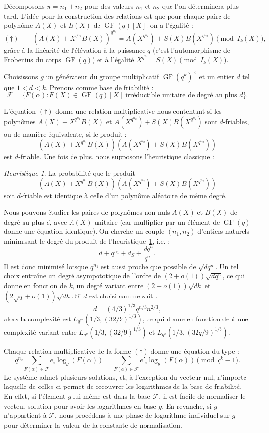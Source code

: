 \documentclass[a4paper, titlepage, 11pt]{article}
\theoremstyle{definition}
\theoremstyle{remark}
\newtheorem{heur}[theo]{Heuristique}
\def\o{o}
\def\gf{\operatorname{GF}}
\begin{document}
Décomposons $n = n_1 + n_2$ pour des valeurs $n_1$ et $n_2$ que l'on déterminera plus tard. L'idée pour la construction des relations est que pour chaque paire de polynôme $A(X)$ et $B(X)$ de $\gf(q)[X]$, on a l'égalité :
$$(\dagger) \qquad {\left( A(X) + X^{q^{n_1}}B(X)\right)}^{q^{n_2}} = A(X^{q^{n_2}}) + S(X)B(X^{q^{n_2}}) \pmod{I_k(X)},$$
grâce à la linéarité de l'élévation à la puissance $q$ (c'est l'automorphisme de Frobenius du corps $\gf(q)$) et à l'égalité $X^{q^n} = S(X) \pmod{I_k(X)}$.

Choisissons $g$ un générateur du groupe multiplicatif $\gf(q^k)^\times$ et un entier $d$ tel que $1 < d < k$. Prenons comme base de friabilité :
$$\mathcal{F} =  \{F(\alpha) : F(X) \in \gf(q)[X] \text{ irréductible unitaire de degré au plus } d \}.$$

L'équation $(\dagger)$ donne une relation multiplicative nous contentant si les polynômes $A(X) + X^{q^{n_1}}B(X)$ et $A(X^{q^{n_2}}) + S(X)B(X^{q^{n_2}})$ sont $d$-friables, ou de manière équivalente, si le produit :
$$\left( A(X) + X^{q^{n_1}}B(X)\right)\left( A(X^{q^{n_2}}) + S(X)B(X^{q^{n_2}})\right)$$
est $d$-friable. Une fois de plus, nous supposons l'heuristique classique :
\begin{heur}\label{heur:polydfriable}
La probabilité que le produit $$\left( A(X) + X^{q^{n_1}}B(X)\right)\left( A(X^{q^{n_2}}) + S(X)B(X^{q^{n_2}})\right)$$ soit $d$-friable est identique à celle d'un polynôme aléatoire de même degré.
\end{heur}

Nous pouvons étudier les paires de polynômes non nuls $A(X)$ et $B(X)$ de degré au plus $d$, avec $A(X)$ unitaire (car multiplier par un élément de $\gf(q)$ donne une équation identique). On cherche un couple $(n_1, n_2)$ d'entiers naturels minimisant le degré du produit de l'heuristique~\ref{heur:polydfriable}, i.e. :
$$d + q^{n_1} + d_S + \frac{dq^n}{q^{n_1}}.$$
Il est donc minimisé lorsque $q^{n_1}$ est aussi proche que possible de $\sqrt{dq^n}$. Un tel choix entraîne un degré asympototique de l'ordre de $(2+\o(1))\sqrt{dq^n}$, ce qui donne en fonction de $k$, un degré variant entre $(2+\o(1))\sqrt{dk}$ et $(2\sqrt{q}+\o(1))\sqrt{dk}$.
Si $d$ est choisi comme suit :
$$d = (4/3)^{1/3}q^{n/3}n^{2/3},$$
alors la complexité est $L_{q^{q^n}}(1/3, (32/9)^{1/3})$, ce qui donne en fonction de $k$ une complexité variant entre $L_{q^k}(1/3, (32/9)^{1/3})$ et $L_{q^k}(1/3, (32q/9)^{1/3})$.

Chaque relation multiplicative de la forme $(\dagger)$ donne une équation du type :
$$q^{n_2} \sum_{F(\alpha) \in \mathcal{F}} e_i \log_g(F(\alpha)) = \sum_{F(\alpha) \in \mathcal{F}} e'_i \log_g(F(\alpha)) \pmod{q^k-1}.$$
Le système admet plusieurs solutions, et, à l'exception du vecteur nul, n'importe laquelle de celles-ci permet de recouvrer les logarithmes de la base de friabilité. En effet, si l'élément $g$ lui-même est dans la base $\mathcal{F}$, il est facile de normaliser le vecteur solution pour avoir les logarithmes en base $g$. En revanche, si $g$ n'appartient à $\mathcal{F}$, nous procédons à une phase de logarithme individuel sur $g$ pour déterminer la valeur de la constante de normalisation.
\end{document}
